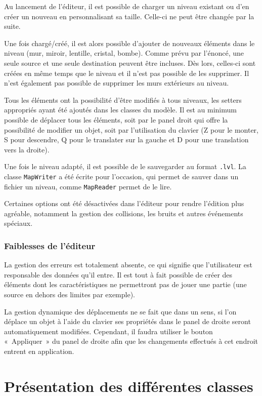 \documentclass[]{report}
\begin{document}
Au lancement de l’éditeur, il est possible de charger un niveau existant 
ou d’en créer un nouveau en personnalisant sa taille. Celle-ci ne peut 
être changée par la suite.

Une fois chargé/créé, il est alors possible d’ajouter de nouveaux éléments 
dans le niveau (mur, miroir, lentille, cristal, bombe). Comme prévu par l’énoncé,
une seule source et une seule destination peuvent être incluses. Dès lors, 
celles-ci sont créées en même temps que le niveau et il n’est pas possible de 
les supprimer. Il n'est également pas possible de supprimer les murs extérieurs
au niveau.

Tous les éléments ont la possibilité d’être modifiés à tous niveaux, les setters
appropriés ayant été ajoutés dans les classes du modèle. Il est au minimum possible de déplacer
tous les éléments, soit par le panel droit qui offre la possibilité de modifier
un objet, soit par l’utilisation du clavier (Z pour le monter, S pour descendre, Q pour le translater
sur la gauche et D pour une translation vers la droite).

Une fois le niveau adapté, il est possible de le sauvegarder au format \texttt{.lvl}. 
La classe \texttt{MapWriter} a été écrite pour l’occasion, qui permet de sauver 
dans un fichier un niveau, comme \texttt{MapReader} permet de le lire.

Certaines options ont été désactivées dans l’éditeur pour rendre l’édition plus agréable,
notamment la gestion des collisions, les bruits et autres événements spéciaux.

\subsubsection{Faiblesses de l’éditeur}

La gestion des erreurs est totalement absente, ce qui signifie que l’utilisateur est 
responsable des données qu’il entre. Il est tout à fait possible de créer des éléments
dont les caractéristiques ne permettront pas de jouer une partie (une source en dehors
des limites par exemple).

La gestion dynamique des déplacements ne se fait que dans un sens, si l’on déplace un objet
à l’aide du clavier ses propriétés dans le panel de droite seront automatiquement modifiées.
Cependant, il faudra utiliser le bouton «~Appliquer~» du panel de droite afin que les changements
effectués à cet endroit entrent en application.


\newpage
\section{Présentation des différentes classes}
\end{document}
